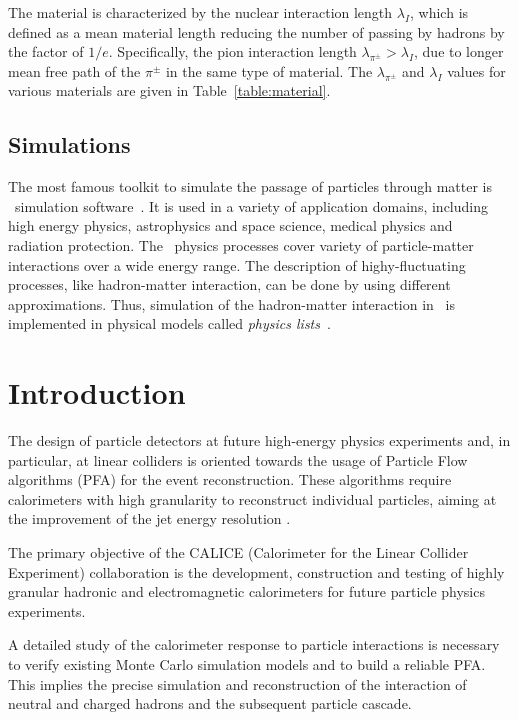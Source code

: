 The material is characterized by the nuclear interaction length $\lambda_{I}$, which is defined as a mean material length reducing the number of passing by hadrons by the factor of $1/e$. 
Specifically, the pion interaction length $\lambda_{\pi^\pm} > \lambda_{I}$, due to longer mean free path of the $\pi^\pm$ in the same type of material. 
The   $\lambda_{\pi^\pm} $ and $ \lambda_{I}$ values for various materials are given in Table~\ref{table:material}.
\subsection{Simulations}
The most famous toolkit to simulate the passage of particles through matter is \geant\ simulation software~\cite{Allison:2006ve}. 
It is used in a variety of application domains, including high energy physics, astrophysics and space science, medical physics and radiation protection. 
The \geant\ physics processes cover variety of particle-matter interactions over a wide energy range.
The description of highy-fluctuating processes, like hadron-matter interaction, can be done by using different approximations. 
Thus, simulation of the hadron-matter interaction in \geant\ is implemented in physical models called \textit{physics lists}~\cite{bib:G4pl}.

\section{Introduction}
\label{sec:ecalintro}
The design of particle detectors at future high-energy physics experiments and, in particular, at linear colliders is oriented towards the usage of Particle Flow algorithms (PFA) for the event reconstruction. 
These algorithms require calorimeters with high granularity to reconstruct individual particles, aiming at the improvement of the jet energy resolution \cite{Brient:2002gh}. 

The primary objective of the CALICE (Calorimeter for the Linear Collider Experiment) collaboration is the development, construction and testing of highly granular hadronic and electromagnetic  calorimeters for future particle physics experiments.

A detailed study of the calorimeter response to particle interactions is necessary to verify existing Monte Carlo simulation models and to build a reliable PFA. 
This implies the precise simulation and reconstruction of the interaction of neutral and charged hadrons and the subsequent particle cascade.

